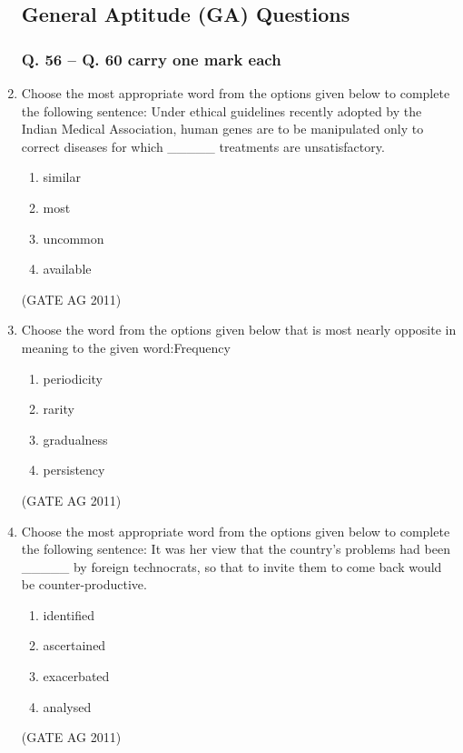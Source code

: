 \documentclass[journal,12pt,onecolumn]{IEEEtran}
\theoremstyle{remark}
\begin{document}
\begin{enumerate}
\subsection*{General Aptitude (GA) Questions}



\subsubsection*{Q. 56 -- Q. 60 carry one mark each}

\item Choose the most appropriate word from the options given below to complete the following sentence:  
Under ethical guidelines recently adopted by the Indian Medical Association, human genes are to be manipulated only to correct diseases for which \_\_\_\_\_ treatments are unsatisfactory.


\begin{enumerate}
\item similar
\item most
\item uncommon
\item available
\end{enumerate}
\hfill{(GATE AG 2011)}




\item Choose the word from the options given below that is most nearly opposite in meaning to the given word:Frequency

\begin{enumerate}
\item periodicity
\item rarity
\item gradualness
\item persistency
\end{enumerate}
\hfill{(GATE AG 2011)}

\item Choose the most appropriate word from the options given below to complete the following sentence:  
It was her view that the country's problems had been \_\_\_\_\_ by foreign technocrats, so that to invite them to come back would be counter-productive.
\begin{multicols}{4}
\begin{enumerate}
\item identified
\item ascertained
\item exacerbated
\item analysed
\end{enumerate}
\end{multicols}
\hfill{(GATE AG 2011)}


\end{enumerate}
\end{document}

